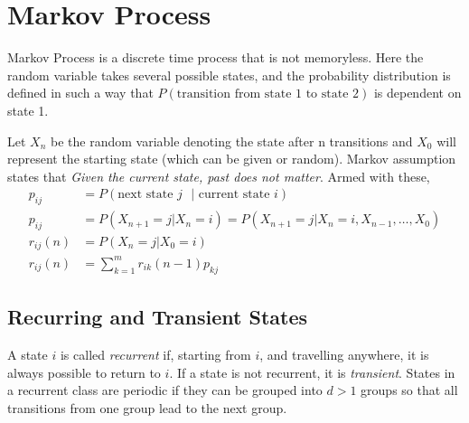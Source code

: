 \documentclass[../probability-notes.tex]{subfiles}
\begin{document}
    \chapter{Markov Process}
    Markov Process is a discrete time process that is not memoryless. Here the random variable takes several possible states, and the probability distribution is defined in such a way that $P(\text{transition from state 1 to state 2})$ is dependent on state 1.\newline

    Let $X_{n}$ be the random variable denoting the state after n transitions and $X_{0}$ will represent the starting state (which can be given or random). Markov assumption states that \emph{Given the current state, past does not matter}. Armed with these,
    \begin{align*}
        p_{ij} &= P(\text{next state $j$ $|$ current state $i$})\\
        p_{ij} &= P(X_{n+1}=j|X_{n}=i) = P(X_{n+1}=j|X_{n}=i, X_{n-1}, \ldots, X_{0})\\
        r_{ij}(n) &= P(X_{n}=j|X_{0}=i) \tag*{or, in state $j$ after $n$ steps}\\
        r_{ij}(n) &= \sum_{k=1}^{m} r_{ik}(n-1)p_{kj}
    \end{align*}

    \section{Recurring and Transient States}
    A state $i$ is called \emph{recurrent} if, starting from $i$, and travelling anywhere, it is always possible to return to $i$. If a state is not recurrent, it is \emph{transient}. States in a recurrent class are periodic if they can be grouped into $d > 1$ groups so that all transitions from one group lead to the next group.
\end{document}
